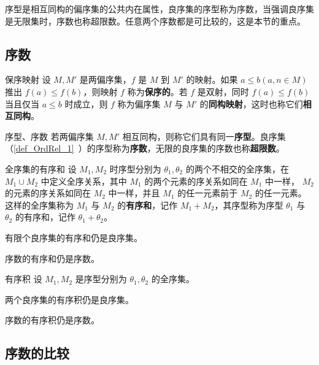 
\begin{issues}
\issueTODO
\end{issues}

序型是相互同构的偏序集的公共内在属性，良序集的序型称为序数，当强调良序集是无限集时，序数也称超限数。任意两个序数都是可比较的，这是本节的重点。
\subsection{序数}
\begin{definition}{保序映射}
设 $M,M'$ 是两偏序集，$f$ 是 $M$ 到 $M'$ 的映射。如果 $a\leq b(a,n\in M)$ 推出 $f(a)\leq f(b)$，则映射 $f$ 称为\textbf{保序的}。若 $f$ 是双射，同时 $f(a)\leq f(b)$ 当且仅当 $a\leq b$ 时成立，则 $f$ 称为偏序集 $M$ 与 $M'$ 的\textbf{同构映射}，这时也称它们\textbf{相互同构}。
\end{definition}
\begin{definition}{序型、序数}
若两偏序集 $M,M'$ 相互同构，则称它们具有同一\textbf{序型}。良序集（\autoref{def_OrdRel_1}~）的序型称为\textbf{序数}，无限的良序集的序数也称\textbf{超限数}。
\end{definition}
\begin{definition}{全序集的有序和}
设 $M_1,M_2$ 时序型分别为 $\theta_1,\theta_2$ 的两个不相交的全序集，在 $M_1\cup M_2$ 中定义全序关系，其中 $M_1$ 的两个元素的序关系如同在 $M_1$ 中一样， $M_2$ 的元素的序关系如同在 $M_2$ 中一样，并且 $M_1$ 的任一元素前于 $M_2$ 的任一元素。这样的全序集称为 $M_1$ 与 $M_2$ 的\textbf{有序和}，记作 $M_1+M_2$，其序型称为序型 $\theta_1$ 与 $\theta_2$ 的有序和，记作 $\theta_1+\theta_2$。
\end{definition}
\begin{theorem}{}
有限个良序集的有序和仍是良序集。
\end{theorem}
\begin{corollary}{}
序数的有序和仍是序数。
\end{corollary}
\begin{definition}{有序积}
设 $M_1,M_2$ 是序型分别为 $\theta_1,\theta_2$ 的全序集。
\end{definition}
\begin{theorem}{}
两个良序集的有序积仍是良序集。
\end{theorem}
\begin{corollary}{}
序数的有序积仍是序数。
\end{corollary}
\subsection{序数的比较}
